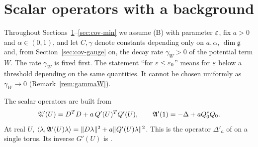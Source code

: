 \section{Scalar operators with a background}\label{sec:cov-scalar}

Throughout Sections~\ref{sec:cov-scalar}--\ref{sec:cov-min} we assume (B) with parameter $\varepsilon$, fix $a>0$ and $\alpha\in(0,1)$, and let $C,\gamma$ denote constants depending only on $a,\alpha$, $\dim\mathfrak g$ and, from Section~\ref{sec:cov-gauge} on, the decay rate $\gamma_W>0$ of the potential term $W$. The rate $\gamma_W$ is fixed first. The statement ``for $\varepsilon\le\varepsilon_0$'' means for $\varepsilon$ below a threshold depending on the same quantities. It cannot be chosen uniformly as $\gamma_W\to0$ (Remark~\ref{rem:gammaW}).

The scalar operators are built from
\[
\mathfrak A'(U)=D^TD+a\,Q'(U)^TQ'(U),\qquad \mathfrak A'(1)=-\Delta+aQ_0^*Q_0 .
\]
At real $U$, $\langle \lambda,\mathfrak A'(U)\lambda\rangle=\|D\lambda\|^2+a\|Q'(U)\lambda\|^2$. This is the operator $\Delta'_a$ of \cite[(3.24)]{BalBackground} on a single torus. Its inverse $G'(U)$ is \cite[$G'$, (3.25)]{BalBackground}.

